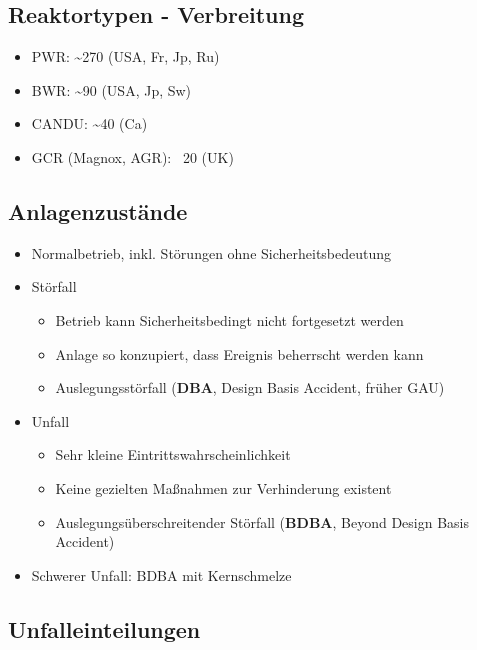 \documentclass[12pt]{article}
\begin{document}
\subsection{Reaktortypen - Verbreitung}
\begin{itemize}
  \item PWR: \textasciitilde 270 (USA, Fr, Jp, Ru)
  \item BWR: \textasciitilde 90 (USA, Jp, Sw)
  \item CANDU: \textasciitilde 40 (Ca)
  \item GCR (Magnox, AGR): ~20 (UK)
\end{itemize}

\subsection{Anlagenzustände}
\begin{itemize}
  \item Normalbetrieb, inkl. Störungen ohne Sicherheitsbedeutung
  \item Störfall
  \begin{itemize}
    \item Betrieb kann Sicherheitsbedingt nicht fortgesetzt werden
    \item Anlage so konzupiert, dass Ereignis beherrscht werden kann
    \item Auslegungsstörfall (\textbf{DBA}, Design Basis Accident, früher GAU)
  \end{itemize}
  \item Unfall
  \begin{itemize}
    \item Sehr kleine Eintrittswahrscheinlichkeit
    \item Keine gezielten Maßnahmen zur Verhinderung existent
    \item Auslegungsüberschreitender Störfall (\textbf{BDBA}, Beyond Design Basis Accident)
  \end{itemize}
  \item Schwerer Unfall: BDBA mit Kernschmelze
\end{itemize}

\subsection{Unfalleinteilungen}
\end{document}
